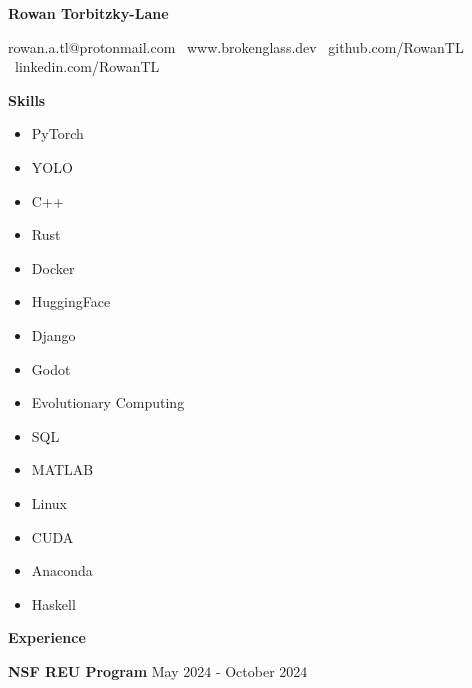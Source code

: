\documentclass[11pt]{article}
\begin{document}
\begin{center}
    \textbf{\huge Rowan Torbitzky-Lane}\\
    \hrulefill
\end{center}

\begin{center}
    rowan.a.tl@protonmail.com \textbullet \ www.brokenglass.dev \textbullet \ github.com/RowanTL \textbullet  \ linkedin.com/RowanTL
\end{center}


\begin{center}
    \textbf{Skills}
\end{center}

\begin{multicols}{3}
    \begin{itemize}[noitemsep, topsep=0pt, partopsep=0pt, parsep=0pt, itemsep=0pt]
        \item PyTorch
        \item YOLO
        \item C++
        \item Rust
        \item Docker
        \item HuggingFace
        \item Django
        \item Godot
        \item Evolutionary Computing
        \item SQL
        \item MATLAB
        \item Linux
        \item CUDA
        \item Anaconda
        \item Haskell
    \end{itemize}
\end{multicols}

\begin{center}
    \textbf{Experience}
\end{center}

\textbf{NSF REU Program} \hfill May 2024 - October 2024
\end{document}
